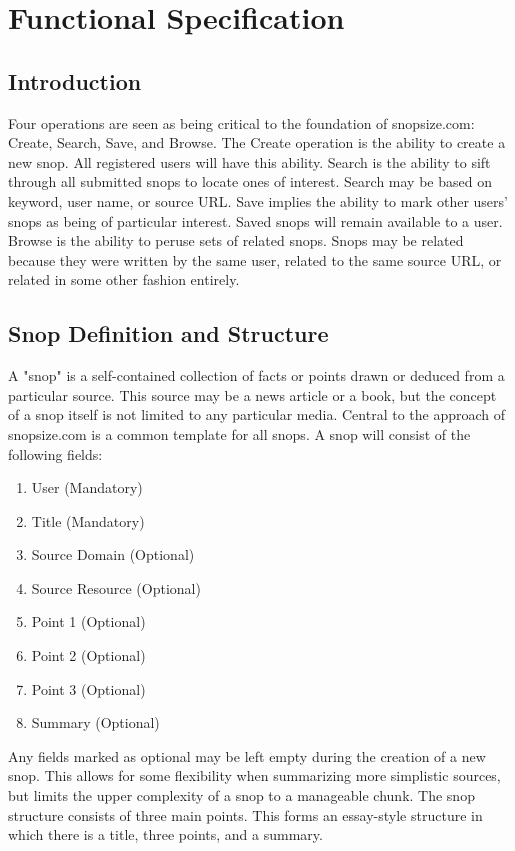 \documentclass[11pt]{article}
\begin{document}
\section{Functional Specification}
\label{sec:functional_spec}
\subsection{Introduction}
Four operations are seen as being critical to the foundation of snopsize.com: Create, Search, Save, and Browse. The Create operation is the ability to create a new snop. All registered users will have this ability. Search is the ability to sift through all submitted snops to locate ones of interest. Search may be based on keyword, user name, or source URL. Save implies the ability to mark other users' snops as being of particular interest. Saved snops will remain available to a user. Browse is the ability to peruse sets of related snops. Snops may be related because they were written by the same user, related to the same source URL, or related in some other fashion entirely.
\subsection{Snop Definition and Structure}
\label{sec:snop_structure}
A "snop" is a self-contained collection of facts or points drawn or deduced from a particular source. This source may be a news article or a book, but the concept of a snop itself is not limited to any particular media. Central to the approach of snopsize.com is a common template for all snops. A snop will consist of the following fields:
\begin{enumerate}
\item User (Mandatory)
\item Title (Mandatory)
\item Source Domain (Optional)
\item Source Resource (Optional)
\item Point 1 (Optional)
\item Point 2 (Optional)
\item Point 3 (Optional)
\item Summary (Optional)
\end{enumerate}
Any fields marked as optional may be left empty during the creation of a new snop. This allows for some flexibility when summarizing more simplistic sources, but limits the upper complexity of a snop to a manageable chunk. The snop structure consists of three main points. This forms an essay-style structure in which there is a title, three points, and a summary.
\end{document}
